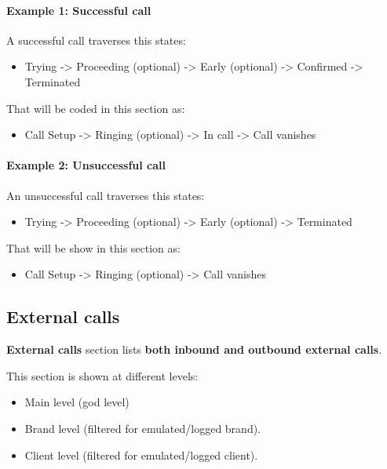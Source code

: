 \documentclass[letterpaper,10pt,spanish]{sphinxmanual}
\begin{document}
\paragraph{Example 1: Successful call}

A successful call traverses this states:
\begin{itemize}
\item {} 
Trying -\textgreater{} Proceeding (optional) -\textgreater{} Early (optional) -\textgreater{} Confirmed -\textgreater{} Terminated

\end{itemize}

That will be coded in this section as:
\begin{itemize}
\item {} 
Call Setup -\textgreater{} Ringing (optional) -\textgreater{} In call -\textgreater{} Call vanishes

\end{itemize}
\paragraph{Example 2: Unsuccessful call}

An unsuccessful call traverses this states:
\begin{itemize}
\item {} 
Trying -\textgreater{} Proceeding (optional) -\textgreater{} Early (optional) -\textgreater{} Terminated

\end{itemize}

That will be show in this section as:
\begin{itemize}
\item {} 
Call Setup -\textgreater{} Ringing (optional) -\textgreater{} Call vanishes

\end{itemize}


\subsection{External calls}
\label{administration_portal/brand/calls/external_calls:id1}\label{administration_portal/brand/calls/external_calls::doc}\label{administration_portal/brand/calls/external_calls:external-calls}
\textbf{External calls} section lists \textbf{both inbound and outbound external calls}.

This section is shown at different levels:
\begin{itemize}
\item {} 
Main level (god level)

\item {} 
Brand level (filtered for emulated/logged brand).

\item {} 
Client level (filtered for emulated/logged client).

\end{itemize}
\end{document}
